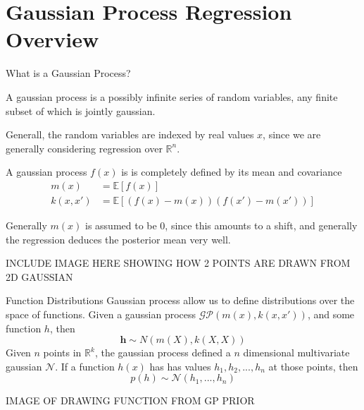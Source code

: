 \documentclass[10pt]{beamer}
\begin{document}
\section[GP Regression]{Gaussian Process Regression Overview}
\label{sec:gauss-proc-regr}

\begin{frame}{What is a Gaussian Process?}
  \begin{definition}
    A gaussian process is a possibly infinite series of random variables, any finite subset of which is jointly gaussian.
  \end{definition}


  Generall, the random variables are indexed by real values $x$, since we are generally considering regression over $\mathbb{R}^{n}$.

  A gaussian process $f(x)$ is is completely defined by its mean and covariance
  \begin{equation}
    \begin{split}
      m(x) &= \mathbb{E} \left[ f(x) \right] \\
      k(x,x') &= \mathbb{E} \left[ \left( f(x) - m(x) \right)  \left( f(x') - m(x') \right)\right] 
    \end{split}
  \end{equation}
  \begin{alertenv}
    Generally $m(x)$ is assumed to be 0, since this amounts to a shift, and generally the regression deduces the posterior mean very well. 
  \end{alertenv}

  INCLUDE IMAGE HERE SHOWING HOW 2 POINTS ARE DRAWN FROM 2D GAUSSIAN
  
\end{frame}

\begin{frame}{Function Distributions}
  Gaussian process allow us to define distributions over the space of functions. Given a gaussian process $\mathcal{GP} \left( m(x) , k(x,x') \right)$, and some function $h$, then
  \begin{equation}
    \mathbf{h} \sim N(m(X) , k(X,X))
  \end{equation}
  Given $n$ points in $\mathbb{R}^{k}$, the gaussian process defined a $n$ dimensional multivariate gaussian $\mathcal{N}$. If a function $h(x)$ has has values $h_1,h_2,...,h_{n}$ at those points, then
  \begin{equation}
    p \left( h \right) \sim \mathcal{N}(h_{1}, ..., h_{n})
  \end{equation}

  IMAGE OF DRAWING FUNCTION FROM GP PRIOR
\end{frame}
\end{document}
